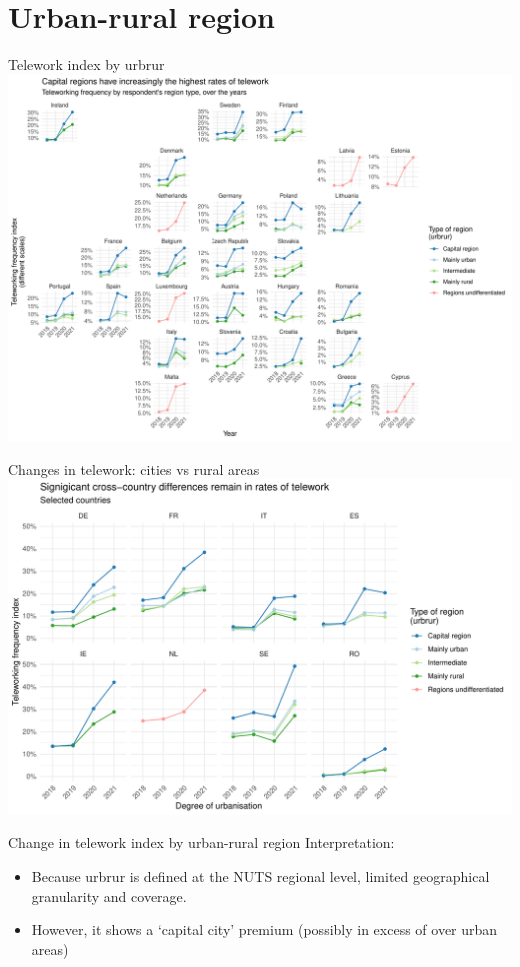 \documentclass[10pt,handout]{beamer}
\begin{document}
\section{Urban-rural region}
\begin{frame}{Telework index by urbrur}
\centering
\includegraphics[width=\textwidth,height=0.9\textheight,keepaspectratio]{Telework_urbrur_eu.pdf}
\end{frame}

\begin{frame}{Changes in telework: cities vs rural areas}
\centering
\includegraphics[width=\textwidth,height=0.9\textheight,keepaspectratio]{Telework_urbrur_selected.pdf}
\end{frame}


\begin{frame}{Change in telework index by urban-rural region}
Interpretation:
\begin{itemize}
\item Because urbrur is defined at the NUTS regional level, limited geographical granularity and coverage.
\item However, it shows a `capital city' premium (possibly in excess of over urban areas)
\end{itemize}
\end{frame}
\end{document}
